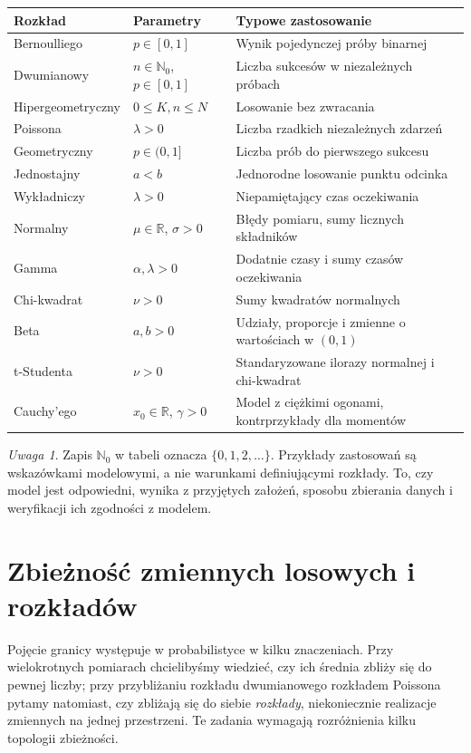 \documentclass[11pt,a4paper,oneside]{report}
\numberwithin{equation}{chapter}
\theoremstyle{plain}
\theoremstyle{definition}
\theoremstyle{remark}
\newtheorem{uwaga}{Uwaga}[chapter]
\newcommand{\R}{\mathbb{R}}
\newcommand{\N}{\mathbb{N}}
\begin{document}
\begin{center}
\small
\begin{tabular}{@{}p{3.0cm}p{4.1cm}p{5.9cm}@{}}
\hline
Rozkład & Parametry & Typowe zastosowanie \\
\hline
Bernoulliego & $p\in[0,1]$ & Wynik pojedynczej próby binarnej \\
Dwumianowy & $n\in\N_0$, $p\in[0,1]$ & Liczba sukcesów w niezależnych próbach \\
Hipergeometryczny & $0\leq K,n\leq N$ & Losowanie bez zwracania \\
Poissona & $\lambda>0$ & Liczba rzadkich niezależnych zdarzeń \\
Geometryczny & $p\in(0,1]$ & Liczba prób do pierwszego sukcesu \\
Jednostajny & $a<b$ & Jednorodne losowanie punktu odcinka \\
Wykładniczy & $\lambda>0$ & Niepamiętający czas oczekiwania \\
Normalny & $\mu\in\R$, $\sigma>0$ & Błędy pomiaru, sumy licznych składników \\
Gamma & $\alpha,\lambda>0$ & Dodatnie czasy i sumy czasów oczekiwania \\
Chi-kwadrat & $\nu>0$ & Sumy kwadratów normalnych \\
Beta & $a,b>0$ & Udziały, proporcje i zmienne o wartościach w $(0,1)$ \\
t-Studenta & $\nu>0$ & Standaryzowane ilorazy normalnej i chi-kwadrat \\
Cauchy'ego & $x_0\in\R$, $\gamma>0$ & Model z ciężkimi ogonami, kontrprzykłady dla momentów \\
\hline
\end{tabular}
\end{center}

\begin{uwaga}
Zapis $\N_0$ w tabeli oznacza $\{0,1,2,\ldots\}$.
Przykłady zastosowań są wskazówkami modelowymi, a nie
warunkami definiującymi rozkłady. To, czy model jest odpowiedni,
wynika z przyjętych założeń, sposobu zbierania danych
i weryfikacji ich zgodności z modelem.
\end{uwaga}

\chapter{Zbieżność zmiennych losowych i rozkładów}
\label{ch:convergence}

Pojęcie granicy występuje w probabilistyce w kilku znaczeniach.
Przy wielokrotnych pomiarach chcielibyśmy wiedzieć, czy
ich średnia zbliży się do pewnej liczby; przy przybliżaniu
rozkładu dwumianowego rozkładem Poissona pytamy natomiast,
czy zbliżają się do siebie \emph{rozkłady}, niekoniecznie
realizacje zmiennych na jednej przestrzeni. Te zadania
wymagają rozróżnienia kilku topologii zbieżności.
\end{document}

